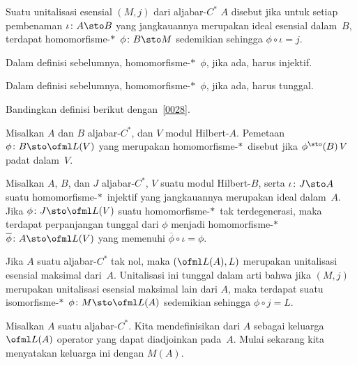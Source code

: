 \begin{defn} Suatu unitalisasi esensial $(M,j)$ dari aljabar-$C^*$ $A$ disebut
 jika untuk setiap pembenaman $\iota\colon A \sto B$ yang jangkauannya merupakan ideal esensial
dalam~$B$, terdapat homomorfisme-$*\,$ $\phi\colon B \sto M$ sedemikian sehingga $\phi
\circ \iota = j$.
\end{defn}

\begin{prop} Dalam definisi sebelumnya, homomorfisme-$*\,$ $\phi$, jika ada, harus
injektif.
\end{prop}

\begin{prop} Dalam definisi sebelumnya, homomorfisme-$*\,$ $\phi$, jika ada, harus
tunggal.
\end{prop}

Bandingkan definisi berikut dengan~\ref{0028}.

\begin{defn} Misalkan $A$ dan $B$ aljabar-$C^*$, dan $V$ modul Hilbert-$A$. Pemetaan
$\phi\colon B \sto \ofml L(V)$ yang merupakan homomorfisme-$*\,$ disebut
 jika $\phi^\sto(B)\,V$ padat dalam~$V$.
\end{defn}

\begin{prop} Misalkan $A$, $B$, dan $J$ aljabar-$C^*$, $V$ suatu modul Hilbert-$B$, serta
$\iota\colon J \sto A$ suatu homomorfisme-$*\,$ injektif yang jangkauannya merupakan ideal dalam~$A$.
Jika $\phi\colon J \sto \ofml L(V)$ suatu homomorfisme-$*\,$ tak terdegenerasi, maka terdapat
perpanjangan tunggal dari $\phi$ menjadi homomorfisme-$*\,$ $\overline\phi\colon A \sto
\ofml L(V)$ yang memenuhi $\overline\phi \circ \iota = \phi$.
\end{prop}

\begin{prop}\label{0038621} Jika $A$ suatu aljabar-$C^*$ tak nol, maka $(\ofml L(A),L)$ merupakan
unitalisasi esensial maksimal dari~$A$. Unitalisasi ini tunggal dalam arti bahwa jika $(M,j)$ merupakan
unitalisasi esensial maksimal lain dari $A$, maka terdapat suatu isomorfisme-$*\,$ $\phi
\colon M \sto \ofml L(A)$ sedemikian sehingga $\phi \circ j = L$.
\end{prop}

\begin{defn}\label{0038641} Misalkan $A$ suatu aljabar-$C^*$. Kita mendefinisikan
 dari $A$ sebagai keluarga $\ofml L(A)$ operator yang dapat diadjoinkan
pada~$A$. Mulai sekarang kita menyatakan keluarga ini
dengan $M(A)$.
\end{defn}









\endinput
